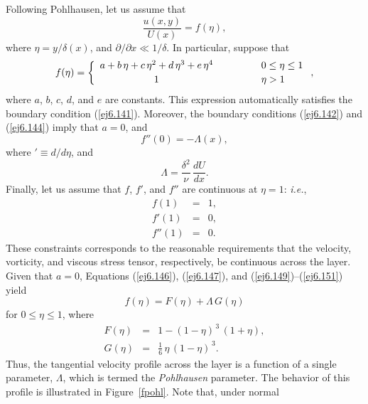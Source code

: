 Following Pohlhausen, let us assume that
\begin{equation}
\frac{u(x,y)}{U(x)} = f(\eta),
\end{equation}
where $\eta = y/\delta(x)$, and $\partial/\partial x\ll 1/\delta$. 
In particular, suppose that
\begin{equation}\label{ej6.146}
f(\eta)=\left\{\begin{array}{ccl}
a+b\,\eta+c\,\eta^2+d\,\eta^3+e\,\eta^4&\mbox{\hspace{1cm}}&0\leq\eta\leq 1\\[0.5ex]
1&&\eta>1\end{array}\right.,
\end{equation}
where $a$, $b$, $c$, $d$, and $e$ are constants. This expression automatically satisfies the boundary condition (\ref{ej6.141}).
Moreover, the boundary conditions (\ref{ej6.142}) and (\ref{ej6.144}) imply that $a=0$, and
\begin{equation}\label{ej6.147}
f''(0) = -\Lambda(x),
\end{equation}
where $'\equiv d/d\eta$, and 
\begin{equation}
\Lambda = \frac{\delta^2}{\nu}\,\frac{dU}{dx}.
\end{equation}
Finally, let us assume that $f$, $f'$, and $f''$ are continuous at $\eta=1$: {\em i.e.},
\begin{eqnarray}
f(1)&=&1,\label{ej6.149}\\[0.5ex]
f'(1)&=&0,\\[0.5ex]
f''(1)&=&0.\label{ej6.151}
\end{eqnarray}
These constraints corresponds to the reasonable requirements that the
velocity, vorticity, and viscous stress tensor, respectively,  be continuous across the layer. 
Given that $a=0$, Equations (\ref{ej6.146}), (\ref{ej6.147}), and (\ref{ej6.149})--(\ref{ej6.151}) yield
\begin{equation}\label{ej6.152}
f(\eta) = F(\eta)+\Lambda\,G(\eta)
\end{equation}
for $0\leq \eta\leq 1$, 
where
\begin{eqnarray}
F(\eta)&=& 1 - (1-\eta)^{\,3}\,(1+\eta),\\[0.5ex]
G(\eta) &=& \frac{1}{6}\,\eta\,(1-\eta)^{\,3}.\label{ej6.154}
\end{eqnarray}
Thus, the tangential velocity profile across the layer is a function of a single parameter, $\Lambda$, which is
termed the {\em Pohlhausen}\/ parameter. The behavior of this profile is illustrated in Figure~\ref{fpohl}. Note that, under normal
